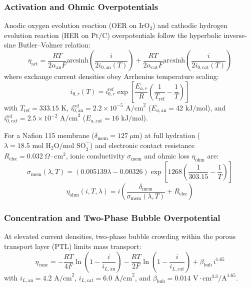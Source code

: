 \documentclass[conference]{IEEEtran}
\begin{document}
\subsubsection{Activation and Ohmic Overpotentials}
Anodic oxygen evolution reaction (OER on $\text{IrO}_2$) and cathodic hydrogen evolution reaction (HER on $\text{Pt/C}$) overpotentials follow the hyperbolic inverse-sine Butler--Volmer relation:
\begin{equation}
\eta_{\text{act}} = \frac{RT}{2\alpha_{\text{an}} F}\text{arcsinh}\!\left(\frac{i}{2 i_{0,\text{an}}(T)}\right) + \frac{RT}{2\alpha_{\text{cat}} F}\text{arcsinh}\!\left(\frac{i}{2 i_{0,\text{cat}}(T)}\right)
\label{eq:eta_act}
\end{equation}
where exchange current densities obey Arrhenius temperature scaling:
\begin{equation}
i_{0,r}(T) = i_{0,r}^{\text{ref}}\exp\!\left[\frac{E_{a,r}}{R}\left(\frac{1}{T_{\text{ref}}} - \frac{1}{T}\right)\right]
\end{equation}
with $T_{\text{ref}} = 333.15\text{ K}$, $i_{0,\text{an}}^{\text{ref}} = 2.2 \times 10^{-5}\text{ A/cm}^2$ ($E_{a,\text{an}} = 42\text{ kJ/mol}$), and $i_{0,\text{cat}}^{\text{ref}} = 2.5 \times 10^{-2}\text{ A/cm}^2$ ($E_{a,\text{cat}} = 16\text{ kJ/mol}$).

For a Nafion 115 membrane ($\delta_{\text{mem}} = 127\ \mu\text{m}$) at full hydration ($\lambda = 18.5\text{ mol H}_2\text{O/mol SO}_3^-$) and electronic contact resistance $R_{\text{elec}} = 0.032\ \Omega\cdot\text{cm}^2$, ionic conductivity $\sigma_{\text{mem}}$ and ohmic loss $\eta_{\text{ohm}}$ are:
\begin{equation}
\sigma_{\text{mem}}(\lambda, T) = (0.005139\lambda - 0.00326)\exp\!\left[1268\left(\frac{1}{303.15} - \frac{1}{T}\right)\right]
\end{equation}
\begin{equation}
\eta_{\text{ohm}}(i, T, \lambda) = i\left(\frac{\delta_{\text{mem}}}{\sigma_{\text{mem}}(\lambda, T)} + R_{\text{elec}}\right)
\end{equation}

\subsubsection{Concentration and Two-Phase Bubble Overpotential}
At elevated current densities, two-phase bubble crowding within the porous transport layer (PTL) limits mass transport:
\begin{equation}
\eta_{\text{conc}} = -\frac{RT}{4F}\ln\!\left(1 - \frac{i}{i_{L,\text{an}}}\right) - \frac{RT}{2F}\ln\!\left(1 - \frac{i}{i_{L,\text{cat}}}\right) + \beta_{\text{bub}}\, i^{1.65}
\label{eq:eta_conc}
\end{equation}
with $i_{L,\text{an}} = 4.2\text{ A/cm}^2$, $i_{L,\text{cat}} = 6.0\text{ A/cm}^2$, and $\beta_{\text{bub}} = 0.014\text{ V}\cdot\text{cm}^{3.3}/\text{A}^{1.65}$.
\end{document}
